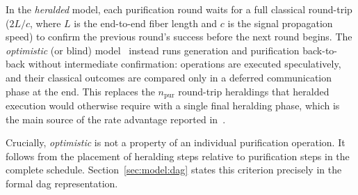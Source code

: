 In the \emph{heralded} model, each purification round waits for a full classical round-trip ($2L/c$, where $L$ is the end-to-end fiber length and $c$ is the signal propagation speed) to confirm the previous round's success before the next round begins. The \emph{optimistic} (or blind) model~\cite{Mobayenjarihani2023Optimistic,Benchasattabuse2025Integrating} instead runs generation and purification back-to-back without intermediate confirmation: operations are executed speculatively, and their classical outcomes are compared only in a deferred communication phase at the end. This replaces the $n_{\mathrm{pur}}$ round-trip heraldings that heralded execution would otherwise require with a single final heralding phase, which is the main source of the rate advantage reported in~\cite{Benchasattabuse2025Integrating}.

Crucially, \emph{optimistic} is not a property of an individual purification operation. It follows from the placement of heralding steps relative to purification steps in the complete schedule. Section~\ref{sec:model:dag} states this criterion precisely in the formal \Gls{dag} representation.